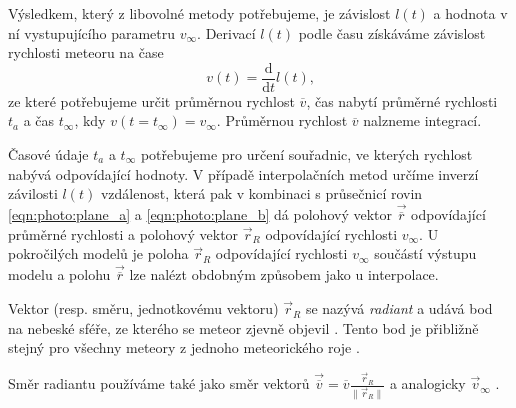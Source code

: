 Výsledkem, který z libovolné metody potřebujeme, je závislost $l(t)$ a hodnota v ní vystupujícího parametru $v_\infty$. Derivací $l(t)$ podle času získáváme závislost rychlosti meteoru na čase
$$
    v(t)=\frac{\text{d}}{\text{d}t}l(t)\text{,}
$$
ze které potřebujeme určit průměrnou rychlost $\overline{v}$, čas nabytí průměrné rychlosti $t_a$ a čas $t_\infty$, kdy $v(t\! =\!t_\infty)=v_\infty$. Průměrnou rychlost $\overline{v}$ nalzneme integrací.

Časové údaje $t_a$ a $t_\infty$ potřebujeme pro určení souřadnic, ve kterých rychlost nabývá odpovídající hodnoty. V případě interpolačních metod určíme inverzí závilosti $l(t)$ vzdálenost, která pak v kombinaci s průsečnicí rovin \eqref{eqn:photo:plane_a} a \eqref{eqn:photo:plane_b} dá polohový vektor $\vec{\overline{r}}$ odpovídající průměrné rychlosti a polohový vektor $\vec{r}_R$ odpovídající rychlosti $v_\infty$. U pokročilých modelů je poloha $\vec{r}_R$ odpovídající rychlosti $v_\infty$ součástí výstupu modelu \cite{singlebodymeteor} a polohu $\vec{\overline{r}}$ lze nalézt obdobným způsobem jako u interpolace.

\smallskip

Vektor (resp. směru, jednotkovému vektoru) $\vec{r}_R$ se nazývá \textit{radiant} a udává bod na nebeské sféře, ze kterého se meteor zjevně objevil \cite{ceplecha}\cite{glossary}. Tento bod je přibližně stejný pro všechny meteory z jednoho meteorického roje \cite{glossary}.

Směr radiantu používáme také jako směr vektorů $\vec{\overline{v}}=\overline{v}\frac{\vec{r}_R}{\lVert\vec{r}_R\rVert}$ a analogicky $\vec{v}_\infty$ \cite{ceplecha}.

\medskip


